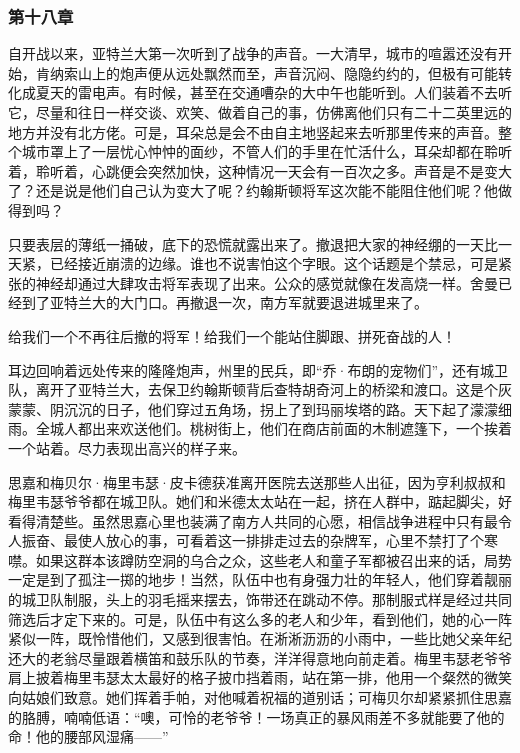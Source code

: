 \subsubsection{第十八章}

\par 自开战以来，亚特兰大第一次听到了战争的声音。一大清早，城市的喧嚣还没有开始，肯纳索山上的炮声便从远处飘然而至，声音沉闷、隐隐约约的，但极有可能转化成夏天的雷电声。有时候，甚至在交通嘈杂的大中午也能听到。人们装着不去听它，尽量和往日一样交谈、欢笑、做着自己的事，仿佛离他们只有二十二英里远的地方并没有北方佬。可是，耳朵总是会不由自主地竖起来去听那里传来的声音。整个城市罩上了一层忧心忡忡的面纱，不管人们的手里在忙活什么，耳朵却都在聆听着，聆听着，心跳便会突然加快，这种情况一天会有一百次之多。声音是不是变大了？还是说是他们自己认为变大了呢？约翰斯顿将军这次能不能阻住他们呢？他做得到吗？
\par 只要表层的薄纸一捅破，底下的恐慌就露出来了。撤退把大家的神经绷的一天比一天紧，已经接近崩溃的边缘。谁也不说害怕这个字眼。这个话题是个禁忌，可是紧张的神经却通过大肆攻击将军表现了出来。公众的感觉就像在发高烧一样。舍曼已经到了亚特兰大的大门口。再撤退一次，南方军就要退进城里来了。
\par 给我们一个不再往后撤的将军！给我们一个能站住脚跟、拼死奋战的人！
\par 耳边回响着远处传来的隆隆炮声，州里的民兵，即“乔·布朗的宠物们”，还有城卫队，离开了亚特兰大，去保卫约翰斯顿背后查特胡奇河上的桥梁和渡口。这是个灰蒙蒙、阴沉沉的日子，他们穿过五角场，拐上了到玛丽埃塔的路。天下起了濛濛细雨。全城人都出来欢送他们。桃树街上，他们在商店前面的木制遮篷下，一个挨着一个站着。尽力表现出高兴的样子来。
\par 思嘉和梅贝尔·梅里韦瑟·皮卡德获准离开医院去送那些人出征，因为亨利叔叔和梅里韦瑟爷爷都在城卫队。她们和米德太太站在一起，挤在人群中，踮起脚尖，好看得清楚些。虽然思嘉心里也装满了南方人共同的心愿，相信战争进程中只有最令人振奋、最使人放心的事，可看着这一排排走过去的杂牌军，心里不禁打了个寒噤。如果这群本该蹲防空洞的乌合之众，这些老人和童子军都被召出来的话，局势一定是到了孤注一掷的地步！当然，队伍中也有身强力壮的年轻人，他们穿着靓丽的城卫队制服，头上的羽毛摇来摆去，饰带还在跳动不停。那制服式样是经过共同筛选后才定下来的。可是，队伍中有这么多的老人和少年，看到他们，她的心一阵紧似一阵，既怜惜他们，又感到很害怕。在淅淅沥沥的小雨中，一些比她父亲年纪还大的老翁尽量跟着横笛和鼓乐队的节奏，洋洋得意地向前走着。梅里韦瑟老爷爷肩上披着梅里韦瑟太太最好的格子披巾挡着雨，站在第一排，他用一个粲然的微笑向姑娘们致意。她们挥着手帕，对他喊着祝福的道别话；可梅贝尔却紧紧抓住思嘉的胳膊，喃喃低语：“噢，可怜的老爷爷！一场真正的暴风雨差不多就能要了他的命！他的腰部风湿痛——”
